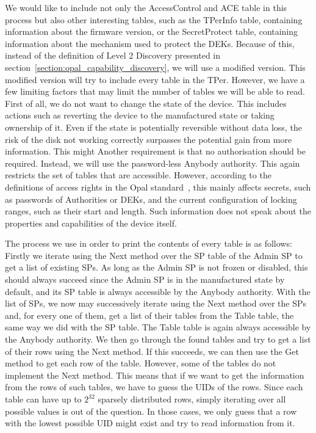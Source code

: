We would like to include not only the AccessControl and ACE table in this process but also other interesting tables, such as the TPerInfo table, containing information about the firmware version, or the SecretProtect table, containing information about the mechanism used to protect the DEKs. 
Because of this, instead of the definition of Level 2 Discovery presented in section~\ref{section:opal_capability_discovery}, we will use a modified version.
This modified version will try to include every table in the TPer.
However, we have a few limiting factors that may limit the number of tables we will be able to read.
First of all, we do not want to change the state of the device. This includes actions such as reverting the device to the manufactured state or taking ownership of it. Even if the state is potentially reversible without data loss, the risk of the disk not working correctly surpasses the potential gain from more information. This might 
Another requirement is that no authorisation should be required. Instead, we will use the password-less Anybody authority. This again restricts the set of tables that are accessible. However, according to the definitions of access rights in the Opal standard~\cite{tcg-opal2}, this mainly affects secrets, such as passwords of Authorities or DEKs, and the current configuration of locking ranges, such as their start and length. Such information does not speak about the properties and capabilities of the device itself.

The process we use in order to print the contents of every table is as follows:
Firstly we iterate using the Next method over the SP table of the Admin SP to get a list of existing SPs. As long as the Admin SP is not frozen or disabled, this should always succeed since the Admin SP is in the manufactured state by default, and its SP table is always accessible by the Anybody authority. 
With the list of SPs, we now may successively iterate using the Next method over the SPs and, for every one of them, get a list of their tables from the Table table, the same way we did with the SP table. The Table table is again always accessible by the Anybody authority.
We then go through the found tables and try to get a list of their rows using the Next method. If this succeeds, we can then use the Get method to get each row of the table. However, some of the tables do not implement the Next method. This means that if we want to get the information from the rows of such tables, we have to guess the UIDs of the rows. Since each table can have up to $2^{32}$ sparsely distributed rows, simply iterating over all possible values is out of the question. In those cases, we only guess that a row with the lowest possible UID might exist and try to read information from it.

